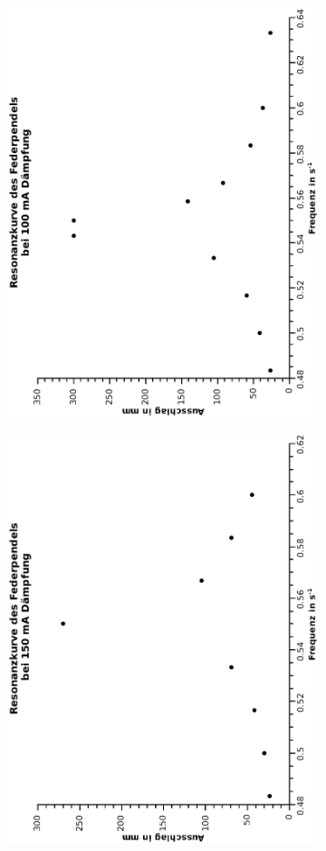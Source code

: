 \documentclass{article}
\begin{document}
\begin{figure}
\begin{subfigure}{0.5\textwidth}
\includegraphics[width=0.9\linewidth,angle=-90]{resonanz100.eps}
\end{subfigure}
\begin{subfigure}{0.5\textwidth}
\includegraphics[width=0.9\linewidth,angle=-90]{resonanz150.eps}
\end{subfigure}
\end{figure}
\end{document}

